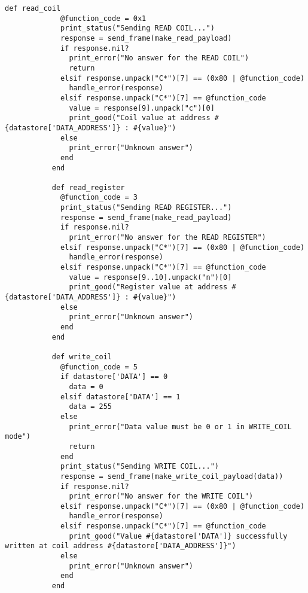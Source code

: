 \documentclass[article,msc=informatik,type=msc,colorback,accentcolor=tud9c]{tudthesis}
\begin{document}
\begin{appendix}
\begin{lstlisting}[caption=Metasploit script of Writing into Modbus Registers, label=lst:Modbusclinet]
  	       def read_coil
  	         @function_code = 0x1
  	         print_status("Sending READ COIL...")
  	         response = send_frame(make_read_payload)
  	         if response.nil?
  	           print_error("No answer for the READ COIL")
  	           return
  	         elsif response.unpack("C*")[7] == (0x80 | @function_code)
  	           handle_error(response)
  	         elsif response.unpack("C*")[7] == @function_code
  	           value = response[9].unpack("c")[0]
  	           print_good("Coil value at address #{datastore['DATA_ADDRESS']} : #{value}")
  	         else
  	           print_error("Unknown answer")
  	         end
  	       end
  	     
  	       def read_register
  	         @function_code = 3
  	         print_status("Sending READ REGISTER...")
  	         response = send_frame(make_read_payload)
  	         if response.nil?
  	           print_error("No answer for the READ REGISTER")
  	         elsif response.unpack("C*")[7] == (0x80 | @function_code)
  	           handle_error(response)
  	         elsif response.unpack("C*")[7] == @function_code
  	           value = response[9..10].unpack("n")[0]
  	           print_good("Register value at address #{datastore['DATA_ADDRESS']} : #{value}")
  	         else
  	           print_error("Unknown answer")
  	         end
  	       end
  	     
  	       def write_coil
  	         @function_code = 5
  	         if datastore['DATA'] == 0
  	           data = 0
  	         elsif datastore['DATA'] == 1
  	           data = 255
  	         else
  	           print_error("Data value must be 0 or 1 in WRITE_COIL mode")
  	           return
  	         end
  	         print_status("Sending WRITE COIL...")
  	         response = send_frame(make_write_coil_payload(data))
  	         if response.nil?
  	           print_error("No answer for the WRITE COIL")
  	         elsif response.unpack("C*")[7] == (0x80 | @function_code)
  	           handle_error(response)
  	         elsif response.unpack("C*")[7] == @function_code
  	           print_good("Value #{datastore['DATA']} successfully written at coil address #{datastore['DATA_ADDRESS']}")
  	         else
  	           print_error("Unknown answer")
  	         end
  	       end
  	     

\end{lstlisting}
\end{appendix}
\end{document}

